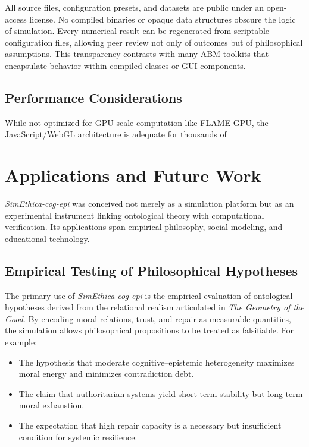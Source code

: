 \documentclass[11pt]{article}
\begin{document}
All source files, configuration presets, and datasets are public under an open-access license.  
No compiled binaries or opaque data structures obscure the logic of simulation.  
Every numerical result can be regenerated from scriptable configuration files, allowing peer review not only of outcomes but of philosophical assumptions.  
This transparency contrasts with many ABM toolkits that encapsulate behavior within compiled classes or GUI components.

\subsection{Performance Considerations}

While not optimized for GPU-scale computation like FLAME GPU, the JavaScript/WebGL architecture is adequate for thousands of
\section{Applications and Future Work}

\textit{SimEthica-cog-epi} was conceived not merely as a simulation platform but as an experimental instrument linking ontological theory with computational verification.  
Its applications span empirical philosophy, social modeling, and educational technology.

\subsection{Empirical Testing of Philosophical Hypotheses}

The primary use of \textit{SimEthica-cog-epi} is the empirical evaluation of ontological hypotheses derived from the relational realism articulated in \textit{The Geometry of the Good}.  
By encoding moral relations, trust, and repair as measurable quantities, the simulation allows philosophical propositions to be treated as falsifiable.  
For example:
\begin{itemize}
  \item The hypothesis that moderate cognitive–epistemic heterogeneity maximizes moral energy and minimizes contradiction debt.
  \item The claim that authoritarian systems yield short-term stability but long-term moral exhaustion.
  \item The expectation that high repair capacity is a necessary but insufficient condition for systemic resilience.
\end{itemize}
\end{document}
